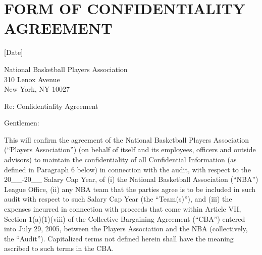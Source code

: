 \documentclass[
]{book}
\begin{document}
\hypertarget{form-of-confidentiality-agreement}{%
\section{FORM OF CONFIDENTIALITY AGREEMENT}\label{form-of-confidentiality-agreement}}

{[}Date{]}

National Basketball Players Association\\
310 Lenox Avenue\\
New York, NY 10027

Re: Confidentiality Agreement

Gentlemen:

This will confirm the agreement of the National Basketball Players Association (``Players Association'') (on behalf of itself and its employees, officers and outside advisors) to maintain the confidentiality of all Confidential Information (as defined in Paragraph 6 below) in connection with the audit, with respect to the 20\_\_-20\_\_ Salary Cap Year, of (i) the National Basketball Association (``NBA'') League Office, (ii) any NBA team that the parties agree is to be included in such audit with respect to such Salary Cap Year (the ``Team(s)''), and (iii) the expenses incurred in connection with proceeds that come within Article VII, Section 1(a)(1)(viii) of the Collective Bargaining Agreement (``CBA'') entered into July 29, 2005, between the Players Association and the NBA (collectively, the ``Audit''). Capitalized terms not defined herein shall have the meaning ascribed to such terms in the CBA.
\end{document}
